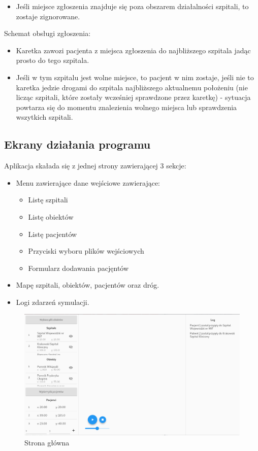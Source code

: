 \documentclass{article}
\begin{document}
\begin{enumerate}
\begin{itemize}
        \item Jeśli miejsce zgłoszenia znajduje się poza obszarem działalności szpitali, to zostaje zignorowane.
    \end{itemize}
    Schemat obsługi zgłoszenia:
    \begin{itemize}
        \item Karetka zawozi pacjenta z miejsca zgłoszenia do najbliższego szpitala jadąc prosto do tego szpitala.
        \item Jeśli w tym szpitalu jest wolne miejsce, to pacjent w nim zostaje, jeśli nie to karetka jedzie drogami do szpitala najbliższego aktualnemu położeniu (nie licząc szpitali, które zostały wcześniej sprawdzone przez karetkę) - sytuacja powtarza się do momentu znalezienia wolnego miejsca lub sprawdzenia wszytkich szpitali.
    \end{itemize}
\end{enumerate}

\subsection{Ekrany działania programu}
Aplikacja skałada się z jednej strony zawierającej 3 sekcje:
\begin{itemize}
    \item Menu zawierające dane wejściowe zawierające:
    \begin{itemize}
        \item Listę szpitali
        \item Listę obiektów
        \item Listę pacjentów
        \item Przyciski wyboru plików wejściowych
        \item Formularz dodawania pacjęntów
    \end{itemize}
    \item Mapę szpitali, obiektów, pacjentów oraz dróg.
    \item Logi zdarzeń symulacji.
\end{itemize}

\begin{figure}[h!]
\centering
\includegraphics[scale=0.3]{main_page.png}
\caption{Strona główna}
\end{figure}
\end{document}

